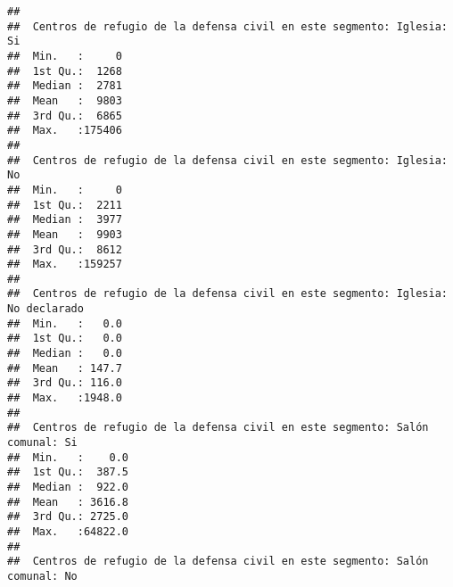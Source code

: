 \documentclass[11pt,]{article}
\begin{document}
\begin{verbatim}
##                                                                                        
##  Centros de refugio de la defensa civil en este segmento: Iglesia: Si
##  Min.   :     0                                                      
##  1st Qu.:  1268                                                      
##  Median :  2781                                                      
##  Mean   :  9803                                                      
##  3rd Qu.:  6865                                                      
##  Max.   :175406                                                      
##                                                                      
##  Centros de refugio de la defensa civil en este segmento: Iglesia: No
##  Min.   :     0                                                      
##  1st Qu.:  2211                                                      
##  Median :  3977                                                      
##  Mean   :  9903                                                      
##  3rd Qu.:  8612                                                      
##  Max.   :159257                                                      
##                                                                      
##  Centros de refugio de la defensa civil en este segmento: Iglesia: No declarado
##  Min.   :   0.0                                                                
##  1st Qu.:   0.0                                                                
##  Median :   0.0                                                                
##  Mean   : 147.7                                                                
##  3rd Qu.: 116.0                                                                
##  Max.   :1948.0                                                                
##                                                                                
##  Centros de refugio de la defensa civil en este segmento: Salón comunal: Si
##  Min.   :    0.0                                                           
##  1st Qu.:  387.5                                                           
##  Median :  922.0                                                           
##  Mean   : 3616.8                                                           
##  3rd Qu.: 2725.0                                                           
##  Max.   :64822.0                                                           
##                                                                            
##  Centros de refugio de la defensa civil en este segmento: Salón comunal: No

\end{verbatim}
\end{document}
